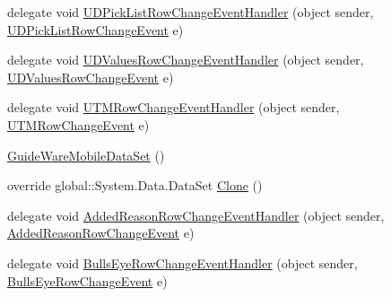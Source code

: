 \begin{DoxyCompactItemize}
\item 
delegate void \hyperlink{class_env_int_1_1_win32_1_1_field_tech_1_1_manager_1_1_data_sets_1_1_guide_ware_mobile_data_set_a89db01e03da1252fbc81b1c724a9662c}{U\+D\+Pick\+List\+Row\+Change\+Event\+Handler} (object sender, \hyperlink{class_env_int_1_1_win32_1_1_field_tech_1_1_manager_1_1_data_sets_1_1_guide_ware_mobile_data_set_a32762a7487696410a34ea07d27caf21}{U\+D\+Pick\+List\+Row\+Change\+Event} e)
\item 
delegate void \hyperlink{class_env_int_1_1_win32_1_1_field_tech_1_1_manager_1_1_data_sets_1_1_guide_ware_mobile_data_set_a762a39b6cc28c857aeac9dba9d7dfe11}{U\+D\+Values\+Row\+Change\+Event\+Handler} (object sender, \hyperlink{class_env_int_1_1_win32_1_1_field_tech_1_1_manager_1_1_data_sets_1_1_guide_ware_mobile_data_set_1_1_u_d_values_row_change_event}{U\+D\+Values\+Row\+Change\+Event} e)
\item 
delegate void \hyperlink{class_env_int_1_1_win32_1_1_field_tech_1_1_manager_1_1_data_sets_1_1_guide_ware_mobile_data_set_af15181f84aa3cca3b3d0445b6ba6e836}{U\+T\+M\+Row\+Change\+Event\+Handler} (object sender, \hyperlink{class_env_int_1_1_win32_1_1_field_tech_1_1_manager_1_1_data_sets_1_1_guide_ware_mobile_data_set_1_1_u_t_m_row_change_event}{U\+T\+M\+Row\+Change\+Event} e)
\item 
\hyperlink{class_env_int_1_1_win32_1_1_field_tech_1_1_manager_1_1_data_sets_1_1_guide_ware_mobile_data_set_a1220ad2590be3bea2d95f22e5bf3f99a}{Guide\+Ware\+Mobile\+Data\+Set} ()
\item 
override global\+::\+System.\+Data.\+Data\+Set \hyperlink{class_env_int_1_1_win32_1_1_field_tech_1_1_manager_1_1_data_sets_1_1_guide_ware_mobile_data_set_ab8ded11b1322ba9752fb14c75932c7cb}{Clone} ()
\item 
delegate void \hyperlink{class_env_int_1_1_win32_1_1_field_tech_1_1_manager_1_1_data_sets_1_1_guide_ware_mobile_data_set_aead16eee25126bf6e05556fe0f089c0c}{Added\+Reason\+Row\+Change\+Event\+Handler} (object sender, \hyperlink{class_env_int_1_1_win32_1_1_field_tech_1_1_manager_1_1_data_sets_1_1_guide_ware_mobile_data_set_03c6c2b8486bc739eb1146c140ad3745}{Added\+Reason\+Row\+Change\+Event} e)
\item 
delegate void \hyperlink{class_env_int_1_1_win32_1_1_field_tech_1_1_manager_1_1_data_sets_1_1_guide_ware_mobile_data_set_ad49d2ce7b82f70b47ec759d125a6e795}{Bulls\+Eye\+Row\+Change\+Event\+Handler} (object sender, \hyperlink{class_env_int_1_1_win32_1_1_field_tech_1_1_manager_1_1_data_sets_1_1_guide_ware_mobile_data_set_1_1_bulls_eye_row_change_event}{Bulls\+Eye\+Row\+Change\+Event} e)

\end{DoxyCompactItemize}
